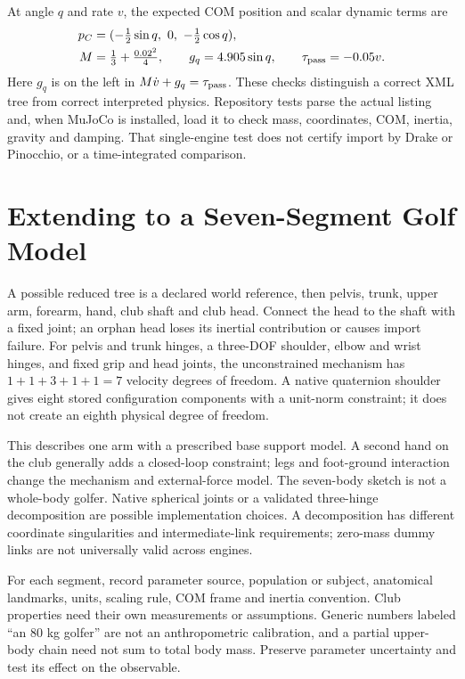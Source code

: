At angle $q$ and rate $v$, the expected COM position and scalar dynamic terms are
\begin{align}
 p_C&=(-\tfrac12\sin q,\ 0,\ -\tfrac12\cos q),\\
 M&=\tfrac13+\tfrac{0.02^2}{4},\qquad
 g_q=4.905\sin q,\qquad \tau_{\rm pass}=-0.05v.
\end{align}
Here $g_q$ is on the left in $M\dot v+g_q=\tau_{\rm pass}$. These checks
distinguish a correct XML tree from correct interpreted physics. Repository
tests parse the actual listing and, when MuJoCo is installed, load it to check
mass, coordinates, COM, inertia, gravity and damping. That single-engine test
does not certify import by Drake or Pinocchio, or a time-integrated comparison.

\section{Extending to a Seven-Segment Golf Model}

A possible reduced tree is a declared world reference, then pelvis, trunk,
upper arm, forearm, hand, club shaft and club head. Connect the head to the
shaft with a fixed joint; an orphan head loses its inertial contribution or
causes import failure. For pelvis and trunk hinges, a three-DOF shoulder, elbow
and wrist hinges, and fixed grip and head joints, the unconstrained mechanism
has $1+1+3+1+1=7$ velocity degrees of freedom. A native quaternion shoulder
gives eight stored configuration components with a unit-norm constraint; it
does not create an eighth physical degree of freedom.

This describes one arm with a prescribed base support model. A second hand on
the club generally adds a closed-loop constraint; legs and foot-ground
interaction change the mechanism and external-force model. The seven-body
sketch is not a whole-body golfer. Native spherical joints or a validated
three-hinge decomposition are possible implementation choices. A decomposition
has different coordinate singularities and intermediate-link requirements;
zero-mass dummy links are not universally valid across engines.

For each segment, record parameter source, population or subject, anatomical
landmarks, units, scaling rule, COM frame and inertia convention. Club properties
need their own measurements or assumptions. Generic numbers labeled ``an 80 kg
golfer'' are not an anthropometric calibration, and a partial upper-body chain
need not sum to total body mass. Preserve parameter uncertainty and test its
effect on the observable.

